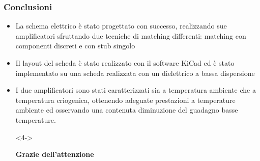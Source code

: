 \documentclass{beamer}
\begin{document}
%    
%
%    
%    


\begin{frame}
    \frametitle{Conclusioni}
    \begin{itemize}
        \item<1-> La schema elettrico è stato progettato con successo, realizzando sue amplificatori sfruttando due tecniche di matching differenti: matching con componenti discreti e con stub singolo
        \item<2-> Il layout del scheda è stato realizzato con il software KiCad ed è stato implementato su una scheda realizzata con un dielettrico a bassa dispersione
        \item<3-> I due amplificatori sono stati caratterizzati sia a temperatura ambiente che a temperatura criogenica, ottenendo adeguate prestazioni a temperature ambiente ed osservando una contenuta diminuzione del guadagno basse temperature.
        \vfill
        \item[]<4->\begin{center}
        \textbf{Grazie dell'attenzione}
    \end{center}
    \end{itemize}
    
    

\end{frame}
\end{document}
